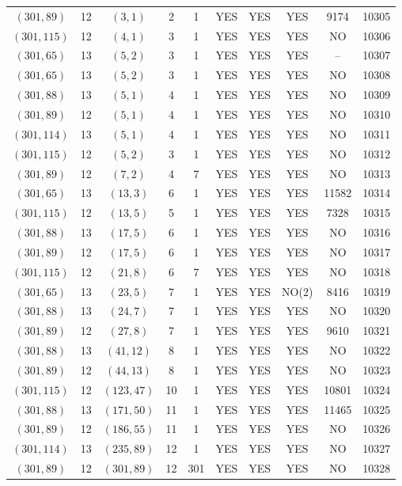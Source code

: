 \begin{longtable}{|c|c|c|c|c|c|c|c|c|c|}
$(301, 89)$ & 12 & $(3, 1)$ & 2 & 1 & YES & YES & YES & 9174 & 10305\\
$(301, 115)$ & 12 & $(4, 1)$ & 3 & 1 & YES & YES & YES & NO & 10306\\
$(301, 65)$ & 13 & $(5, 2)$ & 3 & 1 & YES & YES & YES & -- & 10307\\
$(301, 65)$ & 13 & $(5, 2)$ & 3 & 1 & YES & YES & YES & NO & 10308\\
$(301, 88)$ & 13 & $(5, 1)$ & 4 & 1 & YES & YES & YES & NO & 10309\\
$(301, 89)$ & 12 & $(5, 1)$ & 4 & 1 & YES & YES & YES & NO & 10310\\
$(301, 114)$ & 13 & $(5, 1)$ & 4 & 1 & YES & YES & YES & NO & 10311\\
$(301, 115)$ & 12 & $(5, 2)$ & 3 & 1 & YES & YES & YES & NO & 10312\\
$(301, 89)$ & 12 & $(7, 2)$ & 4 & 7 & YES & YES & YES & NO & 10313\\
$(301, 65)$ & 13 & $(13, 3)$ & 6 & 1 & YES & YES & YES & 11582 & 10314\\
$(301, 115)$ & 12 & $(13, 5)$ & 5 & 1 & YES & YES & YES & 7328 & 10315\\
$(301, 88)$ & 13 & $(17, 5)$ & 6 & 1 & YES & YES & YES & NO & 10316\\
$(301, 89)$ & 12 & $(17, 5)$ & 6 & 1 & YES & YES & YES & NO & 10317\\
$(301, 115)$ & 12 & $(21, 8)$ & 6 & 7 & YES & YES & YES & NO & 10318\\
$(301, 65)$ & 13 & $(23, 5)$ & 7 & 1 & YES & YES & NO(2) & 8416 & 10319\\
$(301, 88)$ & 13 & $(24, 7)$ & 7 & 1 & YES & YES & YES & NO & 10320\\
$(301, 89)$ & 12 & $(27, 8)$ & 7 & 1 & YES & YES & YES & 9610 & 10321\\
$(301, 88)$ & 13 & $(41, 12)$ & 8 & 1 & YES & YES & YES & NO & 10322\\
$(301, 89)$ & 12 & $(44, 13)$ & 8 & 1 & YES & YES & YES & NO & 10323\\
$(301, 115)$ & 12 & $(123, 47)$ & 10 & 1 & YES & YES & YES & 10801 & 10324\\
$(301, 88)$ & 13 & $(171, 50)$ & 11 & 1 & YES & YES & YES & 11465 & 10325\\
$(301, 89)$ & 12 & $(186, 55)$ & 11 & 1 & YES & YES & YES & NO & 10326\\
$(301, 114)$ & 13 & $(235, 89)$ & 12 & 1 & YES & YES & YES & NO & 10327\\
$(301, 89)$ & 12 & $(301, 89)$ & 12 & 301 & YES & YES & YES & NO & 10328\\

\end{longtable}
